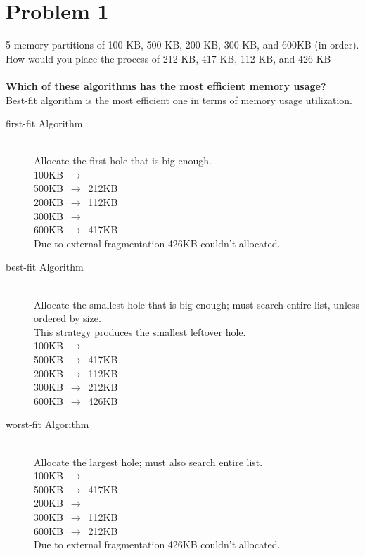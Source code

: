 \documentclass{article}
\begin{document}
\section{Problem 1}
5 memory partitions of 100 KB, 500 KB, 200 KB, 300 KB, and 600KB (in order).
 How would you place the process of 212 KB, 417 KB, 112 KB, and 426 KB
\\
\\ \textbf{Which of these algorithms has the most efficient memory usage?}
\\ Best-fit algorithm is the most efficient one in terms of memory usage utilization.
\begin{description}
    \item[first-fit Algorithm] \hfill \\
    Allocate the first hole that is big enough.
    \\ 100KB $\,\to\,$ 
    \\ 500KB $\,\to\,$ 212KB
    \\ 200KB $\,\to\,$ 112KB
    \\ 300KB $\,\to\,$
    \\ 600KB $\,\to\,$ 417KB
    \\ Due to external fragmentation 426KB couldn't allocated.
     \item[best-fit Algorithm] \hfill \\
    Allocate the smallest hole that is big enough; must search entire list, unless ordered by size.
    \\This strategy produces the smallest leftover hole.
    \\ 100KB $\,\to\,$
    \\ 500KB $\,\to\,$ 417KB
    \\ 200KB $\,\to\,$ 112KB
    \\ 300KB $\,\to\,$ 212KB
    \\ 600KB $\,\to\,$ 426KB
    \item[worst-fit Algorithm] \hfill \\
    Allocate the largest hole; must also search entire list.
    \\ 100KB $\,\to\,$ 
    \\ 500KB $\,\to\,$ 417KB
    \\ 200KB $\,\to\,$ 
    \\ 300KB $\,\to\,$ 112KB
    \\ 600KB $\,\to\,$ 212KB
    \\ Due to external fragmentation 426KB couldn't allocated.
\end{description}
\end{document}
